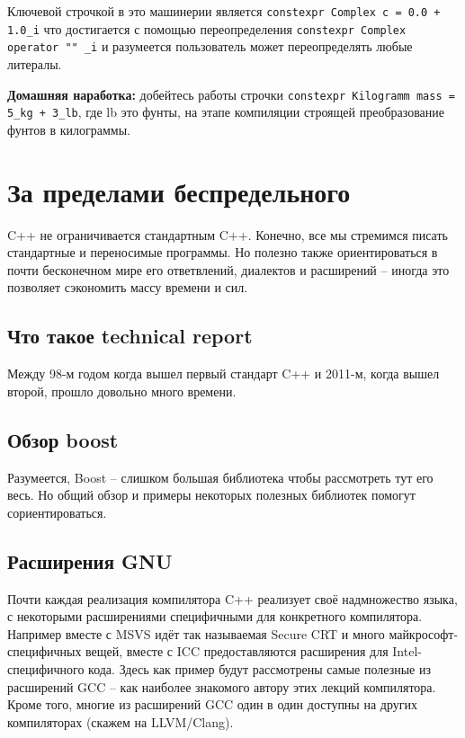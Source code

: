 \documentclass[a4paper,12pt,oneside]{article}
\begin{document}
Ключевой строчкой в это машинерии является \lstinline!constexpr Complex c = 0.0 + 1.0_i! что достигается с помощью переопределения \lstinline!constexpr Complex operator "" _i! и разумеется пользователь может переопределять любые литералы.

\textbf{Домашняя наработка:} добейтесь работы строчки \lstinline!constexpr Kilogramm mass = 5_kg + 3_lb!, где lb это фунты, на этапе компиляции строящей преобразование фунтов в килограммы.

\pagebreak
\section{За пределами беспредельного}

C++ не ограничивается стандартным C++. Конечно, все мы стремимся писать стандартные и переносимые программы. Но полезно также ориентироваться в почти бесконечном мире его ответвлений, диалектов и расширений -- иногда это позволяет сэкономить массу времени и сил.

\subsection{Что такое technical report}

Между 98-м годом когда вышел первый стандарт C++ и 2011-м, когда вышел второй, прошло довольно много времени.

\subsection{Обзор boost}

Разумеется, Boost -- слишком большая библиотека чтобы рассмотреть тут его весь. Но общий обзор и примеры некоторых полезных библиотек помогут сориентироваться.

\subsection{Расширения GNU}

Почти каждая реализация компилятора C++ реализует своё надмножество языка, с некоторыми расширениями специфичными для конкретного компилятора. Например вместе с MSVS идёт так называемая Secure CRT и много майкрософт-специфичных вещей, вместе с ICC предоставляются расширения для Intel-специфичного кода. Здесь как пример будут рассмотрены самые полезные из расширений GCC -- как наиболее знакомого автору этих лекций компилятора. Кроме того, многие из расширений GCC один в один доступны на других компиляторах (скажем на LLVM/Clang).
\end{document}
